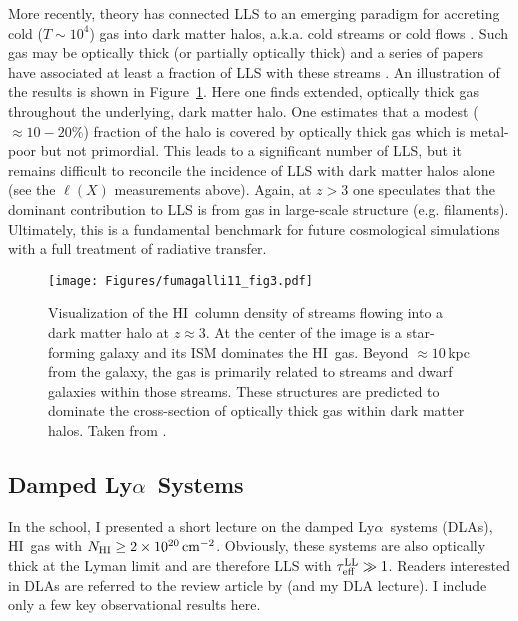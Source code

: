 \documentclass[graybox]{svmult}
\newcommand{\HI}{H{\sc I}}
\def\lya{Ly$\alpha$}
\newcommand{\mnhi}{N_{\rm HI}}
\def\cm#1{\, {\rm cm^{#1}}}
\def\mtll{\tau_{\rm eff}^{\rm LL}}
\begin{document}
More recently, theory has connected LLS to an emerging paradigm
for accreting cold ($T \sim 10^4$) gas into dark matter halos,
a.k.a. cold streams or cold flows \cite[e.g.][]{db06,keres09a}.
Such gas may be optically thick (or partially optically thick)
and a series of papers have associated at least a fraction
of LLS with these streams
\cite[e.g.][]{fg11,fpk+11,freeke12}.
An illustration of the results is shown
in Figure~\ref{fig:f11_fig3}.
Here one finds		
extended, optically thick gas throughout the underlying,
dark matter halo.
One estimates that a modest  ($\approx 10-20\%$)
fraction of the halo is covered by 
optically thick gas which is metal-poor but not primordial.  
This leads to a significant number of LLS, but it remains
difficult to reconcile the incidence of LLS with dark matter halos
alone (see the $\ell(X)$ measurements above).
Again, at $z>3$ one speculates that the 
dominant contribution to LLS is from gas in large-scale structure (e.g.
filaments).  Ultimately, this is a 
fundamental benchmark for future cosmological simulations with
a full treatment of radiative transfer.

%
\begin{figure}[b]
\sidecaption
\texttt{[image: Figures/fumagalli11\_fig3.pdf]}
%
%
\caption{Visualization of the \HI\ column density of 
streams flowing into a dark matter halo at $z \approx 3$.
At the center of the image is a star-forming galaxy and its
ISM dominates the \HI\ gas.  Beyond $\approx 10$\,kpc from
the galaxy, the gas is primarily related to streams and
dwarf galaxies within those streams.  These structures
are predicted to dominate the cross-section of optically 
thick gas within dark matter halos.
Taken from \cite{fpk+11}.
}
\label{fig:f11_fig3}       %
\end{figure}

\subsection{Damped \lya\ Systems}

In the school, I presented a short lecture on the damped \lya\
systems (DLAs), \HI\ gas with $\mnhi \ge 2 \times 10^{20} \cm{-2}$.
Obviously, these systems are also optically thick at the Lyman
limit and are therefore LLS with $\mtll \gg 1$.
Readers interested in DLAs are referred to the review article
by \cite{wgp05} (and my DLA lecture).  I include only a few key
observational results here.
\end{document}
